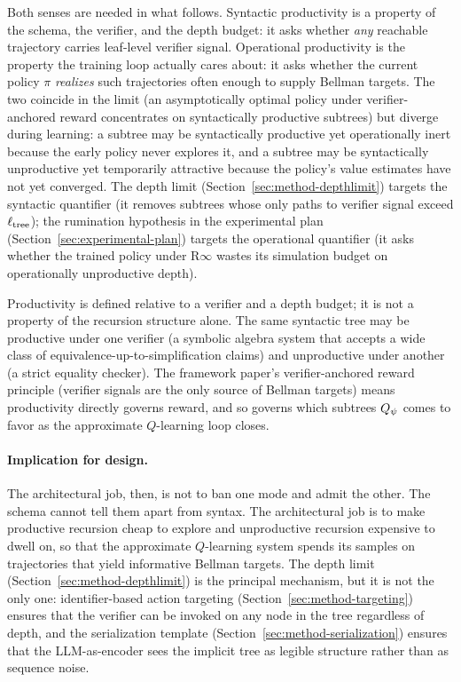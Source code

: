 Both senses are needed in what follows. Syntactic productivity is a
property of the schema, the verifier, and the depth budget: it asks
whether \emph{any} reachable trajectory carries leaf-level verifier
signal. Operational productivity is the property the training loop
actually cares about: it asks whether the current policy $\pi$
\emph{realizes} such trajectories often enough to supply Bellman
targets. The two coincide in the limit (an asymptotically optimal
policy under verifier-anchored reward concentrates on syntactically
productive subtrees) but diverge during learning: a subtree may be
syntactically productive yet operationally inert because the early
policy never explores it, and a subtree may be syntactically
unproductive yet temporarily attractive because the policy's value
estimates have not yet converged. The depth limit
(Section~\ref{sec:method-depthlimit}) targets the syntactic
quantifier (it removes subtrees whose only paths to verifier signal
exceed $\ell_{\mathrm{tree}}$); the rumination hypothesis in the experimental
plan (Section~\ref{sec:experimental-plan}) targets the operational
quantifier (it asks whether the trained policy under R$\infty$ wastes
its simulation budget on operationally unproductive depth).

Productivity is defined relative to a verifier and a depth budget; it is
not a property of the recursion structure alone. The same syntactic tree
may be productive under one verifier (a symbolic algebra system that
accepts a wide class of equivalence-up-to-simplification claims) and
unproductive under another (a strict equality checker). The framework
paper's verifier-anchored reward principle (verifier signals are the
only source of Bellman targets) means productivity directly governs
reward, and so governs which subtrees $Q_{\psi}$ comes to favor as the
approximate $Q$-learning loop closes.

\paragraph{Implication for design.}
The architectural job, then, is not to ban one mode and admit the other.
The schema cannot tell them apart from syntax. The architectural job is
to make productive recursion cheap to explore and unproductive recursion
expensive to dwell on, so that the approximate $Q$-learning system
spends its samples on trajectories that yield informative Bellman
targets. The depth limit (Section~\ref{sec:method-depthlimit}) is the
principal mechanism, but it is not the only one: identifier-based action
targeting (Section~\ref{sec:method-targeting}) ensures that the verifier
can be invoked on any node in the tree regardless of depth, and the
serialization template (Section~\ref{sec:method-serialization}) ensures
that the LLM-as-encoder sees the implicit tree as legible structure
rather than as sequence noise.

